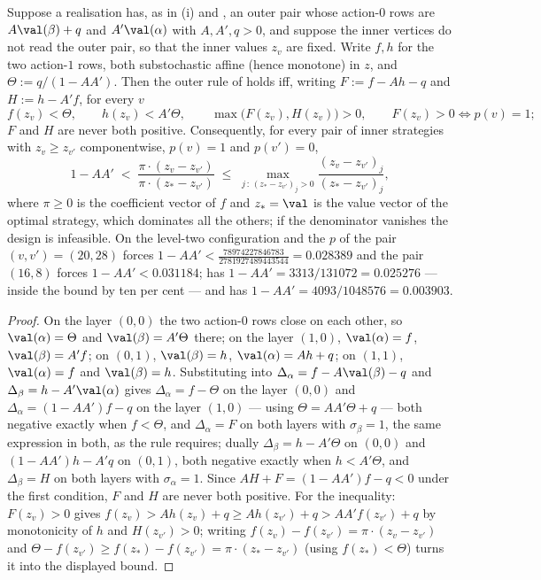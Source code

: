 \begin{lemma}\label{b3:two-cycle}
Suppose a realisation has, as in (i) and , an
outer pair whose action-$0$ rows are $A\val(\beta)+q$ and $A'\val(\alpha)$ with
$A,A',q>0$, and suppose the inner vertices do not read the outer pair, so that
the inner values $z_v$ are fixed. Write $f,h$ for the two action-$1$ rows, both
substochastic affine (hence monotone) in $z$, and $\Theta:=q/(1-AA')$. Then the
outer rule of  holds iff, writing $F:=f-Ah-q$ and
$H:=h-A'f$, for every $v$
\[
 f(z_v)<\Theta,\qquad h(z_v)<A'\Theta,\qquad
 \max\bigl(F(z_v),H(z_v)\bigr)>0,\qquad
 F(z_v)>0\iff p(v)=1 ;
\]
$F$ and $H$ are never both positive. Consequently, for every pair of
inner strategies with $z_v\ge z_{v'}$ componentwise, $p(v)=1$ and $p(v')=0$,
\[
  1-AA'\;<\;\frac{\pi\cdot(z_v-z_{v'})}{\pi\cdot(z_{\ast}-z_{v'})}
  \;\le\;\max_{j\,:\,(z_\ast-z_{v'})_j>0}\frac{(z_v-z_{v'})_j}{(z_{\ast}-z_{v'})_j},
\]
where $\pi\ge0$ is the coefficient vector of $f$ and $z_{\ast}=\val$ is the
value vector of the optimal strategy, which dominates all the others; if the
denominator vanishes the design is infeasible. On the level-two configuration
and the $p$ of  the pair $(v,v')=(20,28)$ forces
$1-AA'<\tfrac{78974227846783}{2781927489443544}=0.028389$ and the pair
$(16,8)$ forces $1-AA'<0.031184$;  has
$1-AA'=3313/131072=0.025276$ --- inside the bound by ten per cent --- and
 has $1-AA'=4093/1048576=0.003903$.
\end{lemma}

\begin{proof}
On the layer $(0,0)$ the two action-$0$ rows close on each other, so
$\val(\alpha)=\Theta$ and $\val(\beta)=A'\Theta$ there; on the layer $(1,0)$,
$\val(\alpha)=f$, $\val(\beta)=A'f$; on $(0,1)$, $\val(\beta)=h$,
$\val(\alpha)=Ah+q$; on $(1,1)$, $\val(\alpha)=f$ and $\val(\beta)=h$.
Substituting into $\Delta_\alpha=f-A\val(\beta)-q$ and
$\Delta_\beta=h-A'\val(\alpha)$ gives $\Delta_\alpha=f-\Theta$ on the layer
$(0,0)$ and $\Delta_\alpha=(1-AA')f-q$ on the layer $(1,0)$ --- using
$\Theta=AA'\Theta+q$ --- both negative exactly when $f<\Theta$, and
$\Delta_\alpha=F$ on both layers with $\sigma_\beta=1$, the same expression in
both, as the rule requires; dually $\Delta_\beta=h-A'\Theta$ on $(0,0)$ and
$(1-AA')h-A'q$ on $(0,1)$, both negative exactly when $h<A'\Theta$, and
$\Delta_\beta=H$ on both layers with $\sigma_\alpha=1$. Since
$AH+F=(1-AA')f-q<0$ under the first condition, $F$ and $H$ are never both
positive. For the inequality: $F(z_v)>0$ gives
$f(z_v)>Ah(z_v)+q\ge Ah(z_{v'})+q>AA'f(z_{v'})+q$ by monotonicity of $h$ and
$H(z_{v'})>0$; writing $f(z_v)-f(z_{v'})=\pi\cdot(z_v-z_{v'})$ and
$\Theta-f(z_{v'})\ge f(z_{\ast})-f(z_{v'})=\pi\cdot(z_{\ast}-z_{v'})$ (using
$f(z_{\ast})<\Theta$) turns it into the displayed bound.
\end{proof}

